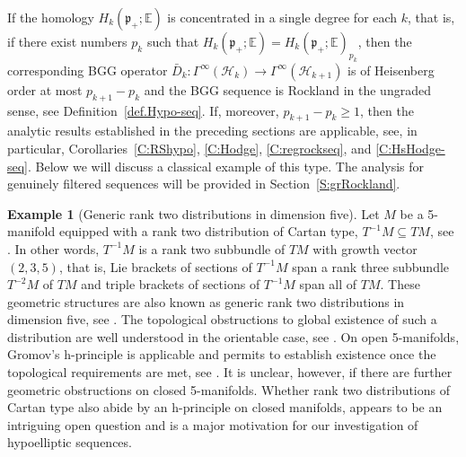 \documentclass[reqno,12pt]{amsart}
\newcommand\poe{\mathfrak p}
\theoremstyle{plain}
\theoremstyle{definition}
\newtheorem{example}[theorem]{Example}
\begin{document}
If the homology $H_k(\poe_+;\mathbb E)$ is concentrated in a single degree for each $k$, that is, if there exist numbers $p_k$ such that $H_k(\poe_+;\mathbb E)=H_k(\poe_+;\mathbb E)_{p_k}$, then the corresponding BGG operator $\bar D_k\colon\Gamma^\infty(\mathcal H_k)\to\Gamma^\infty(\mathcal H_{k+1})$ is of Heisenberg order at most $p_{k+1}-p_k$ and the BGG sequence is Rockland in the ungraded sense, see Definition~\ref{def.Hypo-seq}.
If, moreover, $p_{k+1}-p_k\geq1$, then the analytic results established in the preceding sections are applicable, see, in particular, Corollaries~\ref{C:RShypo}, \ref{C:Hodge}, \ref{C:regrockseq}, and \ref{C:HsHodge-seq}.
Below we will discuss a classical example of this type.
The analysis for genuinely filtered sequences will be provided in Section~\ref{S:grRockland}.


\begin{example}[Generic rank two distributions in dimension five]\label{Ex:BGG235}
Let $M$ be a 5-manifold equipped with a rank two distribution of Cartan type, $T^{-1}M\subseteq TM$, see \cite{C10,BH93,S08}.
In other words, $T^{-1}M$ is a rank two subbundle of $TM$ with growth vector $(2,3,5)$, that is, Lie brackets of sections of $T^{-1}M$ span a rank three subbundle $T^{-2}M$ of $TM$ and triple brackets of sections of $T^{-1}M$ span all of $TM$.
These geometric structures are also known as generic rank two distributions in dimension five, see \cite{S08,CS09a}.
The topological obstructions to global existence of such a distribution are well understood in the orientable case, see \cite[Theorem~1]{DH16}.
On open 5-manifolds, Gromov's h-principle is applicable and permits to establish existence once the topological requirements are met, see \cite[Theorem~2]{DH16}.
It is unclear, however, if there are further geometric obstructions on closed 5-manifolds.
Whether rank two distributions of Cartan type also abide by an h-principle on closed manifolds, appears to be an intriguing open question and is a major motivation for our investigation of hypoelliptic sequences.



\end{example}
\end{document}
